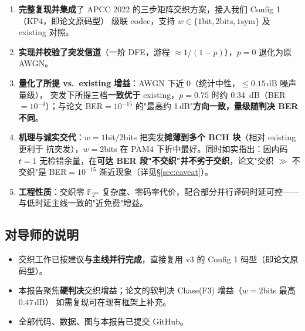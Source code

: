 \documentclass[11pt,a4paper]{article}
\begin{document}
\begin{keybox}[title=\textbf{核心成果}]
\begin{enumerate}[leftmargin=1.5em, itemsep=2pt]
\item \textbf{完整复现并集成}了 APCC 2022 的三步矩阵交织方案，接入我们 Config 1（KP4，即论文原码型）
      级联 codec，支持 $w\in\{1\text{bit},2\text{bits},1\text{sym}\}$ 及 existing 对照。
\item \textbf{实现并校验了突发信道}（一阶 DFE，游程 $\approx 1/(1-p)$），$p{=}0$ 退化为原 AWGN。
\item \textbf{量化了所提 vs.\ existing 增益}：AWGN 下近 0（统计中性，$\le 0.15$\,dB 噪声量级），
      突发下所提三档\textbf{一致优于} existing，$p{=}0.75$ 时约 0.34~dB（BER$=10^{-4}$）；与论文
      BER$=10^{-15}$ 的"最高约 1\,dB"\textbf{方向一致，量级随判决 BER 不同}。
\item \textbf{机理与诚实交代}：$w{=}1$bit/2bits 把突发\textbf{摊薄到多个 BCH 块}（相对 existing 更利于
      抗突发），$w{=}2$bits 在 PAM4 下折中最好。同时如实指出：因内码 $t{=}1$ 无检错余量，在\textbf{可达
      BER 段"不交织"并不劣于交织}，论文"交织 $\gg$ 不交织"是 BER$=10^{-15}$ 渐近现象（详见\S\ref{sec:caveat}）。
\item \textbf{工程性质}：交织零 $\mathbb{F}_{2^m}$ 复杂度、零码率代价，配合部分并行译码时延可控——
      与低时延主线一致的"近免费"增益。
\end{enumerate}
\end{keybox}

\subsection{对导师的说明}

\begin{itemize}[leftmargin=1.5em, itemsep=1pt]
\item 交织工作已按建议\textbf{与主线并行完成}，直接复用 v3 的 Config 1 码型（即论文原码型）。
\item 本报告聚焦\textbf{硬判决}交织增益；论文的软判决 Chase(F3) 增益（$w{=}2$bits 最高 $0.47$\,dB）
      如需复现可在现有框架上补充。
\item 全部代码、数据、图与本报告已提交 GitHub。
\end{itemize}
\end{document}
